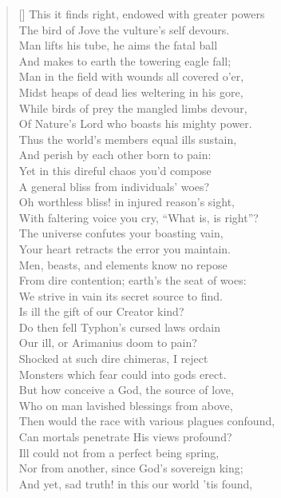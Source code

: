 \begin{verse}[\versewidth]
This it finds right, endowed with greater powers\\
The bird of Jove the vulture's self devours.\\
Man lifts his tube, he aims the fatal ball\\
And makes to earth the towering eagle fall;\\
Man in the field with wounds all covered o'er,\\
Midst heaps of dead lies weltering in his gore,\\
While birds of prey the mangled limbs devour,\\
Of Nature's Lord who boasts his mighty power.\\
Thus the world's members equal ills sustain,\\
And perish by each other born to pain:\\
Yet in this direful chaos you'd compose\\
A general bliss from individuals' woes?\\
Oh worthless bliss! in injured reason's sight,\\
With faltering voice you cry, ``What is, is right''?\\
The universe confutes your boasting vain,\\
Your heart retracts the error you maintain.\\
Men, beasts, and elements know no repose\\
From dire contention; earth's the seat of woes:\\
We strive in vain its secret source to find.\\
Is ill the gift of our Creator kind?\\
Do then fell Typhon's cursed laws ordain\\
Our ill, or Arimanius doom to pain?\\
Shocked at such dire chimeras, I reject\\
Monsters which fear could into gods erect.\\
But how conceive a God, the source of love,\\
Who on man lavished blessings from above,\\
Then would the race with various plagues confound,\\
Can mortals penetrate His views profound?\\
Ill could not from a perfect being spring,\\
Nor from another, since God's sovereign king;\\
And yet, sad truth! in this our world 'tis found,\\

\end{verse}
